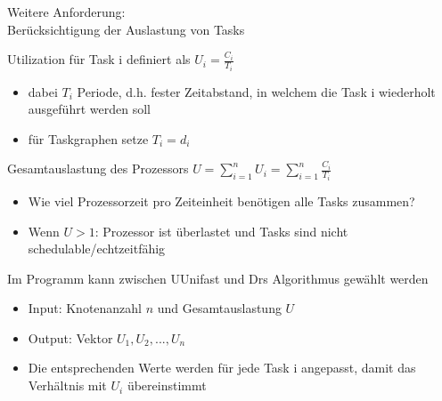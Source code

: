 \documentclass{include/sikslides}
\begin{document}
\begin{frame}{\subsecname}
	\begin{itemize}
		\item Weitere Anforderung: \\
		      Berücksichtigung der Auslastung von Tasks
		      \onslide<2-> {
		\item Utilization für Task i definiert als $U_i = \frac{C_i} { T_i }$
		      \begin{itemize}
			      \item dabei $T_i$ Periode, d.h. fester Zeitabstand, in welchem die Task i wiederholt ausgeführt werden soll
			      \item für Taskgraphen setze $T_i = d_i$
		      \end{itemize}
		      }
		       {
		\item Gesamtauslastung des Prozessors $U = \sum_{i = 1}^{n} U_i = \sum_{i = 1}^{n} \frac{C_i}{T_i}$
		      \begin{itemize}
			      \item \glqq Wie viel Prozessorzeit pro Zeiteinheit benötigen alle Tasks zusammen?\grqq
			      \item Wenn $U > 1 $: Prozessor ist überlastet und Tasks sind nicht schedulable/echtzeitfähig
		      \end{itemize}
		      }
		      \onslide<4-> {
		\item Im Programm kann zwischen UUnifast und Drs Algorithmus gewählt werden
		      \begin{itemize}
			      \item Input: Knotenanzahl $n$ und Gesamtauslastung $U$
			      \item Output: Vektor $U_1,U_2, ...,U_n$
			      \item Die entsprechenden Werte werden für jede Task i angepasst, damit das Verhältnis mit $U_i$ übereinstimmt
		      \end{itemize}
		      }
	\end{itemize}
\end{frame}
\source{}
\end{document}
